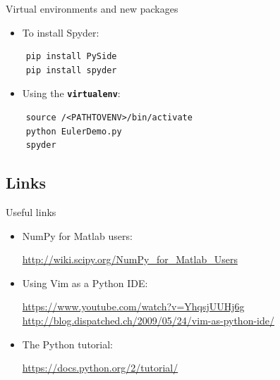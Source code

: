 \documentclass[xcolor=x11names, compress,handout]{beamer}
\renewcommand{\(}{\begin{columns}}
\renewcommand{\)}{\end{columns}}
\newcommand{\<}[1]{\begin{column}{#1}}
\renewcommand{\>}{\end{column}}
\newcommand{\ver}[1]{\texttt{\textbf{#1}}}
\begin{document}
\begin{frame}[fragile]{Virtual environments and new packages}

  \begin{itemize}
    \item To install Spyder:
  \end{itemize}
  \begin{verbatim}
    pip install PySide
    pip install spyder
  \end{verbatim}

  \vspace{10pt}

  \begin{itemize}
    \item Using the \ver{virtualenv}:
  \end{itemize}
  \begin{verbatim}
    source /<PATHTOVENV>/bin/activate
    python EulerDemo.py
    spyder
  \end{verbatim}
  
\end{frame}

\subsection{Links}
\begin{frame}{Useful links}

  \large

  \begin{itemize}
    \item NumPy for Matlab users:

    \vspace{5pt}
    {\scriptsize \centering \url{http://wiki.scipy.org/NumPy_for_Matlab_Users}\\}

    \vspace{8pt}
    \item Using Vim as a Python IDE:

    \vspace{5pt}
    {\scriptsize \centering \url{https://www.youtube.com/watch?v=YhqsjUUHj6g} \\
    \url{http://blog.dispatched.ch/2009/05/24/vim-as-python-ide/}}

    \vspace{8pt}
    \item The Python tutorial:

    \vspace{5pt}
    {\scriptsize \centering \url{https://docs.python.org/2/tutorial/}\\}

  \end{itemize}


\end{frame}
\end{document}
